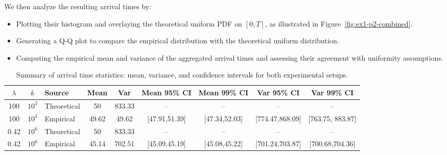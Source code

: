 \documentclass[a4paper]{article}
\begin{document}
\noindent
We then analyze the resulting arrival times by:

\begin{itemize}
    \setlength\itemsep{0.01em}
  \item Plotting their histogram and overlaying the theoretical
    uniform PDF on $[0, T]$, as illustrated in Figure~\ref{fig:ex1-p2-combined}.
  \item Generating a Q-Q plot to compare the empirical distribution
    with the theoretical uniform distribution.
  \item Computing the empirical mean and variance of the aggregated
    arrival times and assessing their agreement with uniformity assumptions.
\end{itemize}

\begin{table}[htbp]
  \centering
  \small
  \begin{tabular}{@{}cc|lcccccc@{}}
    \toprule
    $\lambda$ & $k$ & Source & Mean & Var & Mean 95\% CI & Mean 99\%
    CI & Var 95\% CI & Var 99\% CI \\
    \midrule
    100 & $10^3$ & Theoretical & 50 & 833.33 & -- & -- & -- & -- \\
    100 & $10^3$ & Empirical   & 49.62 & 49.62 & [47.91,51.39] &
    [47.34,52.03] & [774.47,868.09] & [763.75, 883.87] \\
    \midrule
    0.42 & $10^6$ & Theoretical & 50 & 833.33 & -- & -- & -- & -- \\
    0.42 & $10^6$ & Empirical   & 45.14 & 702.51 & [45.09,45.19] &
    [45.08,45.22] & [701.24,703.87] & [700.68,704.36] \\
    \bottomrule
  \end{tabular}
  \caption{Summary of arrival time statistics: mean, variance, and
    confidence intervals for both experimental
  setups.}\label{tab:ex1-p2-ci-summary}
\end{table}
\end{document}
